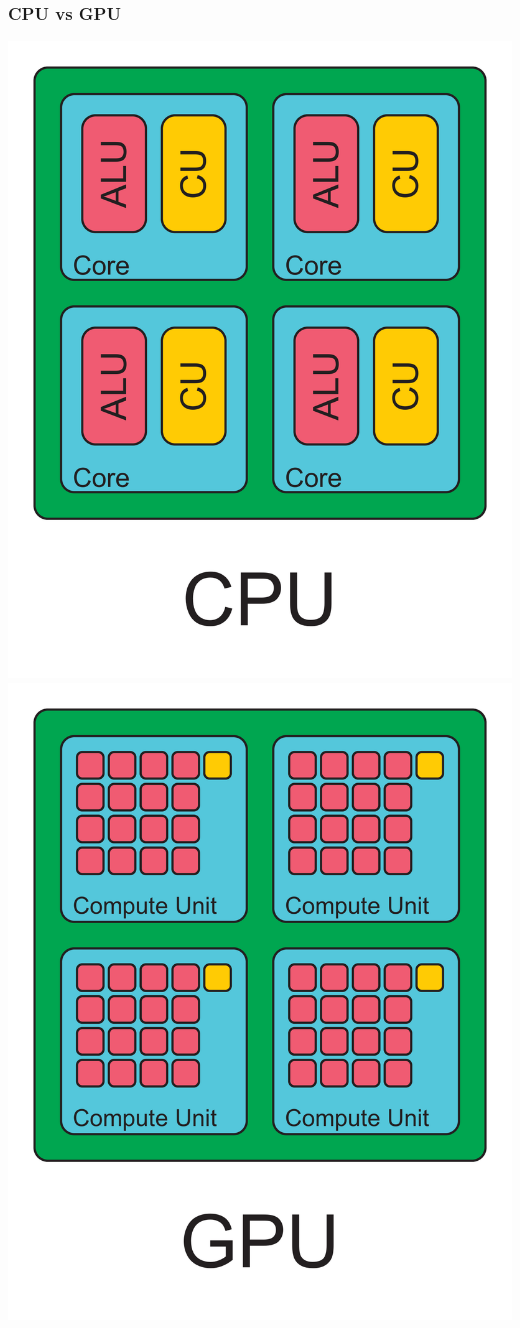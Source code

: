 \documentclass{beamer}
\begin{document}
\begin{frame}
    \frametitle{CPU vs GPU}
    \begin{center}
        \includegraphics[width=.5\textwidth]{../2014-09-25_gputalk/cpu.pdf}
        \includegraphics[width=.5\textwidth]{../2014-09-25_gputalk/gpu.pdf}
    \end{center}
\end{frame}
\end{document}
